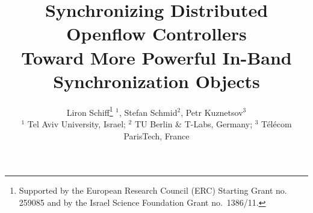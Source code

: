 \documentclass[conference]{sigcomm-alternate}
\begin{document}
\sloppy







\title{Synchronizing Distributed Openflow Controllers\\{\Large Toward More Powerful In-Band Synchronization Objects}}


\author{
Liron Schiff\thanks{Supported by the European Research Council (ERC) Starting Grant no. 259085 and by the Israel Science Foundation Grant no.~1386/11.} $^1$,
Stefan Schmid$^2$, Petr Kuznetsov$^3$ \\
\small $^1$ Tel Aviv University, Israel; $^2$ TU Berlin \& T-Labs,
Germany; $^3$ T\'el\'ecom ParisTech, France
}


\date{}


\maketitle


\thispagestyle{empty}


\end{document}
